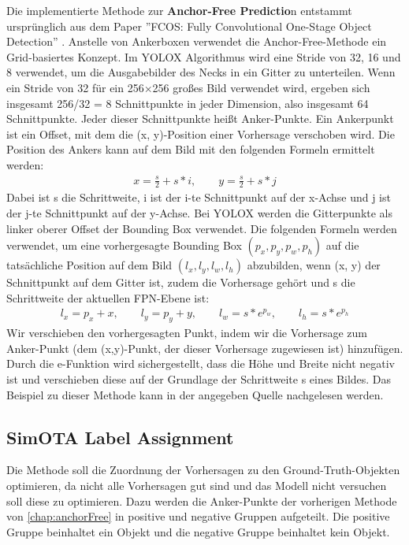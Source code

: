 Die implementierte Methode zur \textbf{Anchor-Free Predictio}n entstammt ursprünglich aus dem Paper ''FCOS: Fully Convolutional One-Stage Object Detection'' \cite{yoloxAnchorFree}. Anstelle von Ankerboxen verwendet die Anchor-Free-Methode ein Grid-basiertes Konzept. Im YOLOX Algorithmus wird eine Stride von 32, 16 und 8 verwendet, um die Ausgabebilder des Necks in ein Gitter zu unterteilen. Wenn ein Stride von 32 für ein 256×256 großes Bild verwendet wird, ergeben sich insgesamt 256/32 = 8 Schnittpunkte in jeder Dimension, also insgesamt 64 Schnittpunkte. Jeder dieser Schnittpunkte heißt Anker-Punkte. Ein Ankerpunkt ist ein Offset, mit dem die (x, y)-Position einer Vorhersage verschoben wird. Die Position des Ankers kann auf dem Bild mit den folgenden Formeln ermittelt werden:
\begin{align}
	x = \frac{s}{2} + s*i, \qquad y = \frac{s}{2} + s*j
\end{align}
Dabei ist s die Schrittweite, i ist der i-te Schnittpunkt auf der x-Achse und j ist der j-te Schnittpunkt auf der y-Achse. Bei YOLOX werden die Gitterpunkte als linker oberer Offset der Bounding Box verwendet. Die folgenden Formeln werden verwendet, um eine vorhergesagte Bounding Box $(p_x, p_y, p_w, p_h)$ auf die tatsächliche Position auf dem Bild $(l_x, l_y, l_w, l_h)$ abzubilden, wenn (x, y) der Schnittpunkt auf dem Gitter ist, zudem die Vorhersage gehört und s die Schrittweite der aktuellen FPN-Ebene ist:
\begin{align}
	l_x=p_x+x, \qquad l_y=p_y+y, \qquad l_w=s*e^{p_w}, \qquad l_h=s*e^{p_h}
\end{align}
Wir verschieben den vorhergesagten Punkt, indem wir die Vorhersage zum Anker-Punkt (dem (x,y)-Punkt, der dieser Vorhersage zugewiesen ist) hinzufügen. Durch die e-Funktion wird sichergestellt, dass die Höhe und Breite nicht negativ ist und verschieben diese auf der Grundlage der Schrittweite s eines Bildes. Das Beispiel zu dieser Methode kann in der angegeben Quelle nachgelesen werden. \cite{yoloxExplanationHowWorks}


\subsection{SimOTA Label Assignment}
Die Methode soll die Zuordnung der Vorhersagen zu den Ground-Truth-Objekten optimieren, da nicht alle Vorhersagen gut sind und das Modell nicht versuchen soll diese zu optimieren. Dazu werden die Anker-Punkte der vorherigen Methode von \ref{chap:anchorFree} in positive und negative Gruppen aufgeteilt. Die positive Gruppe beinhaltet ein Objekt und die negative Gruppe beinhaltet kein Objekt.

